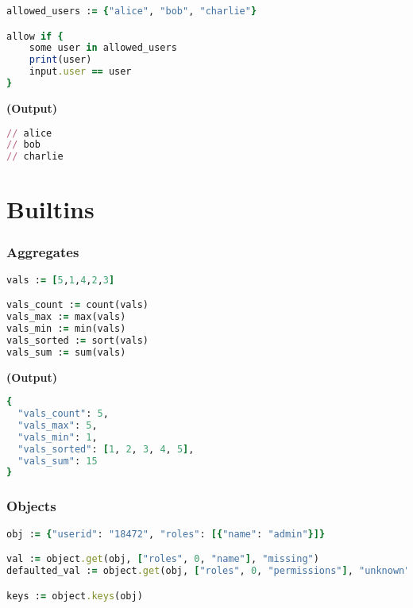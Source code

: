 \documentclass[twocolumn]{article}
\begin{document}
\begin{lstlisting}[language=Ruby]
allowed_users := {"alice", "bob", "charlie"}

allow if {
	some user in allowed_users
	print(user)
	input.user == user
}
\end{lstlisting}



\textbf{\tiny{(Output)}}
\begin{lstlisting}[language=Ruby]
// alice
// bob
// charlie

\end{lstlisting}






\pagebreak


\section*{Builtins}




\vspace{-1em}
\subsubsection*{Aggregates}

\begin{lstlisting}[language=Ruby]
vals := [5,1,4,2,3]

vals_count := count(vals)
vals_max := max(vals)
vals_min := min(vals)
vals_sorted := sort(vals)
vals_sum := sum(vals)
\end{lstlisting}



\textbf{\tiny{(Output)}}
\begin{lstlisting}[language=Ruby]
{
  "vals_count": 5,
  "vals_max": 5,
  "vals_min": 1,
  "vals_sorted": [1, 2, 3, 4, 5],
  "vals_sum": 15
}
\end{lstlisting}



\vspace{-1em}
\subsubsection*{Objects}

\begin{lstlisting}[language=Ruby]
obj := {"userid": "18472", "roles": [{"name": "admin"}]}

val := object.get(obj, ["roles", 0, "name"], "missing")
defaulted_val := object.get(obj, ["roles", 0, "permissions"], "unknown")

keys := object.keys(obj)
\end{lstlisting}
\end{document}
